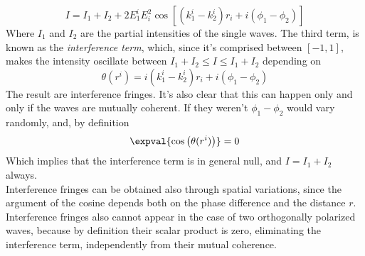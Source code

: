 \documentclass[../electromagnetism.tex]{subfiles}
\begin{document}
\begin{equation}
	I=I_1+I_2+2E^i_1E_i^2\cos\left[ \left( k_1^i-k_2^i \right)r_i+i(\phi_1-\phi_2) \right]
	\label{eq:intensityinterference}
\end{equation}
Where $I_1$ and $I_2$ are the partial intensities of the single waves. The third term, is known as the \textit{interference term}, which, since it's comprised between $[-1,1]$, makes the intensity oscillate between $I_1+I_2\le I \le I_1+I_2$ depending on
\begin{equation}
	\theta(r^i)=i(k_1^i-k_2^i)r_i+i(\phi_1-\phi_2)
	\label{eq:cosinterference}
\end{equation}
The result are interference fringes. It's also clear that this can happen only and only if the waves are mutually coherent. If they weren't $\phi_1-\phi_2$ would vary randomly, and, by definition
\begin{equation*}
	\expval{\cos\left( \theta(r^i) \right)}=0
\end{equation*}
Which implies that the interference term is in general null, and $I=I_1+I_2$ always.\\
Interference fringes can be obtained also through spatial variations, since the argument of the cosine depends both on the phase difference and the distance $r$.\\
Interference fringes also cannot appear in the case of two orthogonally polarized waves, because by definition their scalar product is zero, eliminating the interference term, independently from their mutual coherence.
\end{document}
